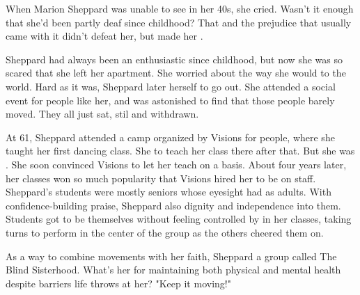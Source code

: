 \documentclass{英语试卷}
\begin{document}
\par When Marion Sheppard was unable to see in her 40s, she cried. Wasn't it enough that she'd been partly deaf since childhood? That  and the prejudice that usually came with it didn't defeat her, but made her .\par
\par Sheppard had always been an enthusiastic  since childhood, but now she was so scared that she  left her apartment. She worried about the way she would  to the world. Hard as it was, Sheppard later  herself to go out. She attended a social event for people like her, and was astonished to find that those people barely moved. They all just sat, stil and withdrawn.\par
\par At 61, Sheppard attended a camp organized by Visions for  people, where she taught her first dancing class. She  to teach her class there after that. But she was . She soon convinced Visions to let her teach on a  basis. About four years later, her classes won so much popularity that Visions hired her to be on staff. Sheppard's students were mostly seniors whose eyesight had  as adults. With confidence-building praise, Sheppard also  dignity and independence into them. Students got to be themselves without feeling controlled by  in her classes, taking turns to perform in the center of the group as the others cheered them on.\par
\par As a way to combine movements with her faith, Sheppard  a group called The Blind Sisterhood. What's her  for maintaining both physical and mental health despite barriers life throws at her? "Keep it moving!"\par
{}
\end{document}
